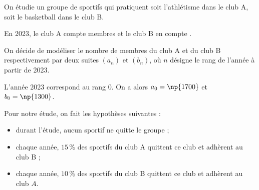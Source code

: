 \medskip

On étudie un groupe de  sportifs qui pratiquent soit l'athlétisme dans le club A, soit le basketball dans le club B.

En 2023, le club A compte  membres et le club B en compte .

\smallskip

On décide de modéliser le nombre de membres du club A et du club B respectivement par deux suites $\left(a_{n}\right)$ et $\left(b_{n}\right)$, où $n$ désigne le rang de l'année à partir de 2023.

L'année 2023 correspond au rang 0. On a alors $a_{0}= \np{1700}$ et $b_{0} = \np{1300}$.

Pour notre étude, on fait les hypothèses suivantes :
\begin{itemize}
\item durant l'étude, aucun sportif ne quitte le groupe ;
\item chaque année, $15\,\%$ des sportifs du club A quittent ce club et adhèrent au club B ;
\item chaque année, $10\,\%$ des sportifs du club B quittent ce club et adhèrent au club $A$.
\end{itemize}

\medskip

